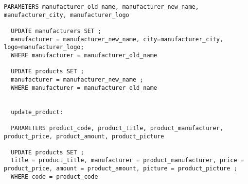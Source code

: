 \begin{lstlisting}[caption=crud\_formset\_procedures]
  PARAMETERS manufacturer_old_name, manufacturer_new_name, manufacturer_city, manufacturer_logo

  UPDATE manufacturers SET ;
  manufacturer = manufacturer_new_name, city=manufacturer_city, logo=manufacturer_logo;
  WHERE manufacturer = manufacturer_old_name

  UPDATE products SET ;
  manufacturer = manufacturer_new_name ;
  WHERE manufacturer = manufacturer_old_name


  update_product:

  PARAMETERS product_code, product_title, product_manufacturer, product_price, product_amount, product_picture

  UPDATE products SET ;
  title = product_title, manufacturer = product_manufacturer, price = product_price, amount = product_amount, picture = product_picture ;
  WHERE code = product_code
\end{lstlisting}


